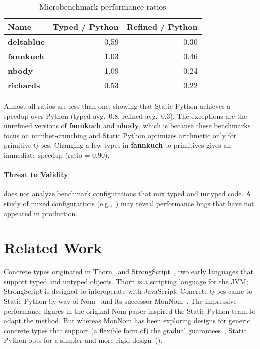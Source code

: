 \documentclass[english,cleveref,crc]{programming}
\newcommand{\SP}{Static Python}
\newcommand{\bmname}[1]{\textbf{#1}}
\begin{document}
\begin{table}[t]
  \caption{Microbenchmark performance ratios}
  \label{t:microbenchmark}

  \centering
  \begin{tabular}{lrr}
    Name               & Typed / Python & Refined / Python \\\midrule
    \bmname{deltablue} &         0.59 &           0.30 \\
    \bmname{fannkuch}  &         1.03 &           0.46 \\
    \bmname{nbody}     &         1.09 &           0.24 \\
    \bmname{richards}  &         0.53 &           0.22
  \end{tabular}

\end{table}

Almost all ratios are less than one, showing that \SP{} achieves a speedup over
Python (typed avg.~$0.8$, refined avg.~$0.3$).
The exceptions are the unrefined versions of \bmname{fannkuch} and
\bmname{nbody}, which is because these benchmarks focus
on number-crunching and \SP{} optimizes arithmetic only for primitive types.
Changing a few types in \bmname{fannkuch} to primitives
gives an immediate speedup (ratio = $0.90$).


\paragraph{Threat to Validity}

 does not analyze benchmark configurations that mix
typed and untyped code. %
A study of mixed configurations (e.g.,~\cite{gm-pepm-2018,gtnffvf-jfp-2019})
may reveal performance bugs that have not appeared in production.


\section{Related Work}
\label{s:related}

Concrete types originated in Thorn~\cite{bfnorsvw-oopsla-2009,wzlov-popl-2010}
and StrongScript~\cite{rzv-ecoop-2015}, two early languages that support typed
and untyped objects.
Thorn is a scripting language for the JVM; StrongScript is designed to
interoperate with JavaScript.
Concrete types came to \SP{} by way of Nom~\cite{mt-oopsla-2017} and its
successor MonNom~\cite{mt-oopsla-2021}.
The impressive performance figures in the original Nom paper inspired the \SP{}
team to adapt the method.
But whereas MonNom has been exploring designs for generic concrete types that
support (a flexible form of) the gradual guarantees~\cite{svcb-snapl-2015},
\SP{} opts for a simpler and more rigid design~().
\end{document}
